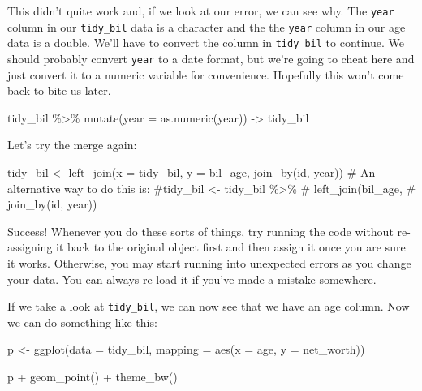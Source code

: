 \documentclass[
  letterpaper,
]{book}
\newenvironment{Shaded}{\begin{snugshade}}{\end{snugshade}}
\newcommand{\AttributeTok}[1]{\textcolor[rgb]{0.40,0.45,0.13}{#1}}
\newcommand{\CommentTok}[1]{\textcolor[rgb]{0.37,0.37,0.37}{#1}}
\newcommand{\FunctionTok}[1]{\textcolor[rgb]{0.28,0.35,0.67}{#1}}
\newcommand{\NormalTok}[1]{\textcolor[rgb]{0.00,0.23,0.31}{#1}}
\newcommand{\OtherTok}[1]{\textcolor[rgb]{0.00,0.23,0.31}{#1}}
\newcommand{\SpecialCharTok}[1]{\textcolor[rgb]{0.37,0.37,0.37}{#1}}
\begin{document}
This didn't quite work and, if we look at our error, we can see why. The
\texttt{year} column in our \texttt{tidy\_bil} data is a character and
the the \texttt{year} column in our age data is a double. We'll have to
convert the column in \texttt{tidy\_bil} to continue. We should probably
convert \texttt{year} to a date format, but we're going to cheat here
and just convert it to a numeric variable for convenience. Hopefully
this won't come back to bite us later.

\begin{Shaded}
\begin{Highlighting}[]
\NormalTok{tidy\_bil }\SpecialCharTok{\%\textgreater{}\%}
  \FunctionTok{mutate}\NormalTok{(}\AttributeTok{year =} \FunctionTok{as.numeric}\NormalTok{(year)) }\OtherTok{{-}\textgreater{}}\NormalTok{ tidy\_bil}
\end{Highlighting}
\end{Shaded}

Let's try the merge again:

\begin{Shaded}
\begin{Highlighting}[]
\NormalTok{tidy\_bil }\OtherTok{\textless{}{-}} \FunctionTok{left\_join}\NormalTok{(}\AttributeTok{x =}\NormalTok{ tidy\_bil, }
                      \AttributeTok{y =}\NormalTok{ bil\_age, }
                      \FunctionTok{join\_by}\NormalTok{(id, year))}
\CommentTok{\# An alternative way to do this is:}
\CommentTok{\#tidy\_bil \textless{}{-} tidy\_bil \%\textgreater{}\%}
\CommentTok{\#  left\_join(bil\_age,}
\CommentTok{\#            join\_by(id, year))}
\end{Highlighting}
\end{Shaded}

Success! Whenever you do these sorts of things, try running the code
without re-assigning it back to the original object first and then
assign it once you are sure it works. Otherwise, you may start running
into unexpected errors as you change your data. You can always re-load
it if you've made a mistake somewhere.

If we take a look at \texttt{tidy\_bil}, we can now see that we have an
age column. Now we can do something like this:

\begin{Shaded}
\begin{Highlighting}[]
\NormalTok{p }\OtherTok{\textless{}{-}} \FunctionTok{ggplot}\NormalTok{(}\AttributeTok{data =}\NormalTok{ tidy\_bil,}
            \AttributeTok{mapping =} \FunctionTok{aes}\NormalTok{(}\AttributeTok{x =}\NormalTok{ age,}
                          \AttributeTok{y =}\NormalTok{ net\_worth))}

\NormalTok{p }\SpecialCharTok{+} \FunctionTok{geom\_point}\NormalTok{() }\SpecialCharTok{+} \FunctionTok{theme\_bw}\NormalTok{()}
\end{Highlighting}
\end{Shaded}
\end{document}
